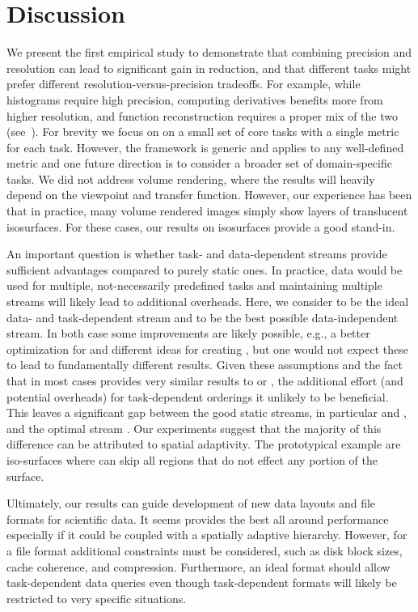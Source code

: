\section{Discussion}

We present the first empirical study to demonstrate that combining precision and resolution can lead
to significant gain in reduction, and that different tasks might prefer different
resolution-versus-precision tradeoffs. For example, while histograms require high precision,
computing derivatives benefits more from higher resolution, and function reconstruction requires a
proper mix of the two (see~). For brevity we focus on on a small set of core
tasks with a single metric for each task. However, the framework is generic and applies to any
well-defined metric and one future direction is to consider a broader set of domain-specific tasks.
We did not address volume rendering, where the results will heavily depend on the viewpoint and
transfer function. However, our experience has been that in practice, many volume rendered images
simply show layers of translucent isosurfaces. For these cases, our results on isosurfaces provide a
good stand-in.

An important question is whether task- and data-dependent streams provide sufficient advantages
compared to purely static ones. In practice, data would be used for multiple, not-necessarily
predefined tasks and maintaining multiple streams will likely lead to additional overheads. Here, we
consider \sopt to be the ideal data- and task-dependent stream and \ssig to be the best possible
data-independent stream. In both case some improvements are likely possible, e.g., a better
optimization for \sopt and different ideas for creating \ssig, but one would not expect these to
lead to fundamentally different results. Given these assumptions and the fact that \ssig in most
cases provides very similar results to \sbit or \swav, the additional effort (and potential
overheads) for task-dependent orderings it unlikely to be beneficial. This leaves a significant gap
between the good static streams, in particular \swav and \sbit, and the optimal stream \sopt. Our
experiments suggest that the majority of this difference can be attributed to spatial adaptivity.
The prototypical example are iso-surfaces where \sopt can skip all regions that do not effect any
portion of the surface.

Ultimately, our results can guide development of new data layouts and file formats for scientific
data. It seems \swav provides the best all around performance especially if it could be coupled with
a spatially adaptive hierarchy. However, for a file format additional constraints must be
considered, such as disk block sizes, cache coherence, and compression. Furthermore, an ideal format
should allow task-dependent data queries even though task-dependent formats will likely be
restricted to very specific situations. 

